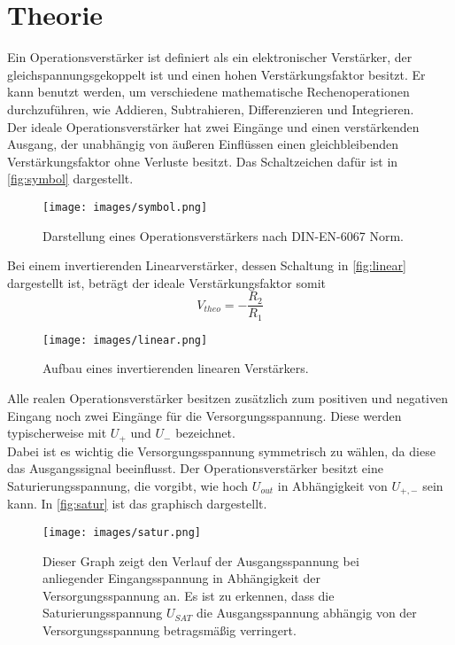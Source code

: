 \section{Theorie}
\label{sec:theorie}

Ein Operationsverstärker ist definiert als ein elektronischer Verstärker, der gleichspannungsgekoppelt ist und einen hohen Verstärkungsfaktor besitzt.
Er kann benutzt werden, um verschiedene mathematische Rechenoperationen durchzuführen, wie Addieren, Subtrahieren, Differenzieren und Integrieren.\\
Der ideale Operationsverstärker hat zwei Eingänge und einen verstärkenden Ausgang, der unabhängig von äußeren Einflüssen einen gleichbleibenden Verstärkungsfaktor ohne Verluste besitzt.
Das Schaltzeichen dafür ist in \autoref{fig:symbol} dargestellt.

\begin{figure}[H]
    \centering
    \texttt{[image: images/symbol.png]}
    \caption{Darstellung eines Operationsverstärkers nach DIN-EN-6067 Norm.\cite{V51}}
    \label{fig:symbol}
\end{figure}

Bei einem invertierenden Linearverstärker, dessen Schaltung in \autoref{fig:linear} dargestellt ist, beträgt der ideale Verstärkungsfaktor somit
\begin{equation}
    V_{theo} = -\frac{R_2}{R_1}
    \label{eq:verstaerkung}
\end{equation}

\begin{figure}[H]
    \centering
    \texttt{[image: images/linear.png]}
    \caption{Aufbau eines invertierenden linearen Verstärkers.\cite{V51}}
    \label{fig:linear}
\end{figure}

Alle realen Operationsverstärker besitzen zusätzlich zum positiven und negativen Eingang noch zwei Eingänge für die Versorgungsspannung.
Diese werden typischerweise mit $U_{+}$ und $U_{-}$ bezeichnet.\\
Dabei ist es wichtig die Versorgungsspannung symmetrisch zu wählen, da diese das Ausgangssignal beeinflusst.
Der Operationsverstärker besitzt eine Saturierungsspannung, die vorgibt, wie hoch $U_{out}$ in Abhängigkeit von $U_{+,-}$ sein kann.
In \autoref{fig:satur} ist das graphisch dargestellt.

\begin{figure}[H]
    \centering
    \texttt{[image: images/satur.png]}
    \caption{Dieser Graph zeigt den Verlauf der Ausgangsspannung bei anliegender Eingangsspannung in Abhängigkeit der Versorgungsspannung an.
    Es ist zu erkennen, dass die Saturierungsspannung $U_{SAT}$ die Ausgangsspannung abhängig von der Versorgungsspannung betragsmäßig verringert.\cite{satur}}
    \label{fig:satur}
\end{figure}

